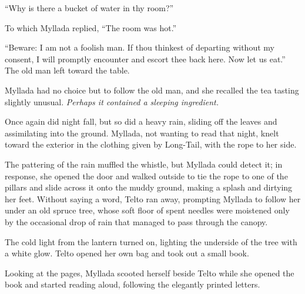 ``Why is there a bucket of water in thy room?''

To which Myllada replied, ``The room was hot.''

``Beware: I am not a foolish man. If thou thinkest of departing without my consent, I will promptly encounter and escort thee back here. Now let us eat.'' The old man left toward the table.

Myllada had no choice but to follow the old man, and she recalled the tea tasting slightly unusual. \emph{Perhaps it contained a sleeping ingredient.}

\centeredstars

Once again did night fall, but so did a heavy rain, sliding off the leaves and assimilating into the ground. Myllada, not wanting to read that night, knelt toward the exterior in the clothing given by Long-Tail, with the rope to her side.

The pattering of the rain muffled the whistle, but Myllada could detect it; in response, she opened the door and walked outside to tie the rope to one of the pillars and slide across it onto the muddy ground, making a splash and dirtying her feet. Without saying a word, Telto ran away, prompting Myllada to follow her under an old spruce tree, whose soft floor of spent needles were moistened only by the occasional drop of rain that managed to pass through the canopy.

The cold light from the lantern turned on, lighting the underside of the tree with a white glow. Telto opened her own bag and took out a small book.

Looking at the pages, Myllada scooted herself beside Telto while she opened the book and started reading aloud, following the elegantly printed letters.

